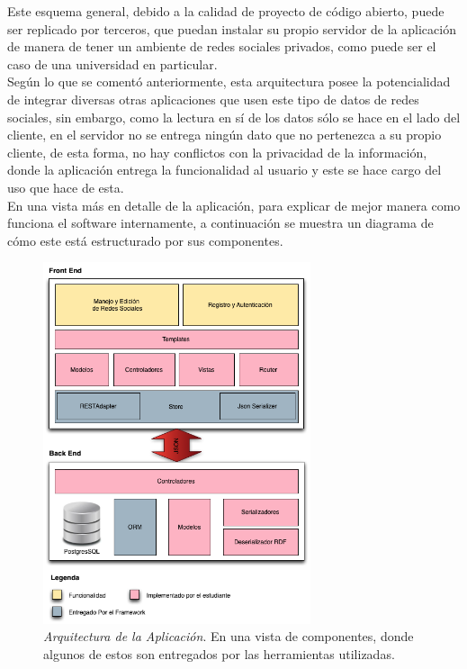 Este esquema general, debido a la calidad de proyecto de código abierto, puede ser replicado por terceros, que puedan instalar su propio servidor de la aplicación de manera de tener un ambiente de redes sociales privados, como puede ser el caso de una universidad en particular.\\

Según lo que se comentó anteriormente, esta arquitectura posee la potencialidad de integrar diversas otras aplicaciones que usen este tipo de datos de redes sociales, sin embargo, como la lectura en sí de los datos sólo se hace en el lado del cliente, en el servidor no se entrega ningún dato que no pertenezca a su propio cliente, de esta forma, no hay conflictos con la privacidad de la información, donde la aplicación entrega la funcionalidad al usuario y este se hace cargo del uso que hace de esta.\\

En una vista más en detalle de la aplicación, para explicar de mejor manera como funciona el software internamente, a continuación se muestra un diagrama de cómo este está estructurado por sus componentes.

\begin{figure}[H]
  \centering
  \includegraphics[width=0.7\textwidth]{images/arquitectura_de_software.png}
  \caption[Arquitectura de la Aplicación]{\emph{Arquitectura de la Aplicación}. En una vista de componentes, donde algunos de estos son entregados por las herramientas utilizadas.}
  \label{arquitectura_de_software}
\end{figure}


